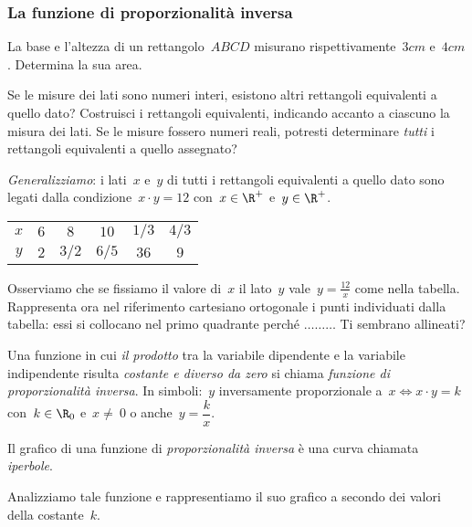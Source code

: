 \subsubsection{La funzione di proporzionalità inversa}
\begin{problema}
La base e l'altezza di un rettangolo~\(ABCD\) misurano 
rispettivamente~\(3\unit{cm}\) e~\(4\unit{cm}\).
Determina la sua area.
\begin{soluzione}
 \dotfill
\end{soluzione}

Se le misure dei lati sono numeri interi, esistono altri rettangoli 
equivalenti 
a quello dato?
Costruisci i rettangoli equivalenti, indicando accanto a ciascuno la misura 
dei 
lati.
Se le misure fossero numeri reali, potresti determinare \emph{tutti} i 
rettangoli equivalenti a quello assegnato?

\emph{Generalizziamo}: i lati~\(x\) e~\(y\) di tutti i rettangoli equivalenti 
a 
quello dato sono legati dalla condizione~\(x\cdot y=12\) con~\(x\in \R^{+}\) 
e~\(y\in \R^{+}\).
\begin{center}
 \begin{tabular}{cccccc}
 \toprule
 \(x\) & \(6\) & \(8\) & \(10\) & \(1/3\) & \(4/3\)\\
 \(y\) & \(2\) & \(3/2\) & \(6/5\) & \(36\) & \(9\)\\
 \bottomrule
 \end{tabular}
\end{center}
Osserviamo che se fissiamo il valore di~\(x\) il lato~\(y\) 
vale~\(y=\frac{12}{x}\) 
come nella tabella.
Rappresenta ora nel riferimento cartesiano ortogonale i punti individuati 
dalla 
tabella: essi si collocano
nel primo quadrante perché \(\ldots \ldots \ldots\) Ti sembrano allineati?
\end{problema}
\begin{definizione}
Una funzione in cui \emph{il prodotto} tra la variabile dipendente e la 
variabile indipendente risulta \emph{costante e diverso da zero}
si chiama \emph{funzione di proporzionalità inversa}. In simboli:~\(y\) 
inversamente proporzionale a~\(x \Leftrightarrow x\cdot y=k\)
con~\(k\in \R_{0}\) e~\(x\neq~0\) o anche~\(y=\dfrac{k}{x}\).
\end{definizione}

Il grafico di una funzione di \emph{proporzionalità inversa} è una curva 
chiamata \emph{iperbole}.

Analizziamo tale funzione e rappresentiamo il suo grafico a secondo dei 
valori 
della costante~\(k\).


